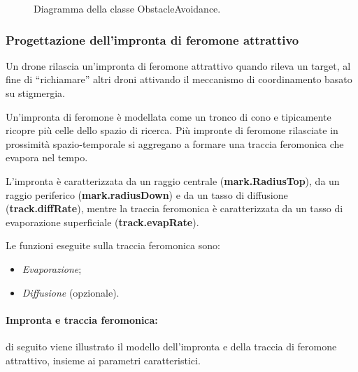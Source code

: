 \begin{figure}[H] 
    \captionsetup{justification=centering, margin=2cm, font=footnotesize}
    \begin{center}
    \end{center}
    \caption{Diagramma della classe ObstacleAvoidance.}
    \label{classe_overlapping}
\end{figure}

\subsubsection{Progettazione dell'impronta di feromone attrattivo}

Un drone rilascia un’impronta di feromone attrattivo quando rileva un target, al fine di “richiamare” altri droni attivando il meccanismo di coordinamento basato su stigmergia. 

Un’impronta di feromone è modellata come un tronco di cono e tipicamente ricopre più celle dello spazio di ricerca. 
Più impronte di feromone rilasciate in prossimità spazio-temporale si aggregano a formare una traccia feromonica che evapora nel tempo. 

L’impronta è caratterizzata da un raggio centrale (\textbf{mark.RadiusTop}), da un raggio periferico (\textbf{mark.radiusDown}) e da un tasso di diffusione (\textbf{track.diffRate}), mentre la traccia feromonica è caratterizzata da un tasso di evaporazione superficiale (\textbf{track.evapRate}). 

Le funzioni eseguite sulla traccia feromonica sono:
\begin{itemize}
	\item \textit{Evaporazione};
	\item \textit{Diffusione} (opzionale).
\end{itemize}

\paragraph{Impronta e traccia feromonica:} di seguito viene illustrato il modello dell'impronta e della traccia di feromone attrattivo, insieme ai parametri caratteristici.

